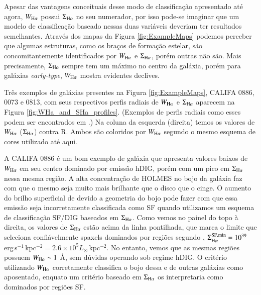 Apesar das vantagens conceituais desse modo de classificação apresentado até agora, $W_{\Ha}$ possui $\Sigma_{\Ha}$ no seu numerador, por isso pode-se imaginar que um modelo de classificação baseado nessas duas variáveis deveriam ter resultados semelhantes. Através dos mapas da Figura \ref{fig:ExampleMaps} podemos perceber que algumas estruturas, como os braços de formação estelar, são concomitantemente identificados por $W_{\Ha}$ e $\Sigma_{\Ha}$, porém outras não são. Mais precisamente, $\Sigma_{\Ha}$ sempre tem um máximo no centro da galáxia, porém para galáxias {\em early-type}, $W_{\Ha}$ mostra evidentes declives.

Três exemplos de galáxias presentes na Figura \ref{fig:ExampleMaps}, CALIFA 0886, 0073 e 0813, com seus respectivos perfis radiais de $W_{\Ha}$ e $\Sigma_{\Ha}$ aparecem na Figura \ref{fig:WHa_and_SHa_profiles}. (Exemplos de perfis radiais como esses podem ser encontrados em \citealt{Papaderos.etal.2013, Belfiore.etal.2016, Belfiore.etal.2017, Gomes.etal.2016b, GonzalezDelgado.etal.2016a}.) Na coluna da esquerda (direita) temos os valores de $W_{\Ha}$ ($\Sigma_{\Ha}$) contra R. Ambos são coloridos por $W_{\Ha}$ segundo o mesmo esquema de cores utilizado até aqui.

A CALIFA 0886 é um bom exemplo de galáxia que apresenta valores baixos de $W_{\Ha}$ em seu centro dominado por emissão hDIG, porém com um pico em $\Sigma_{\Ha}$ nessa mesma região. A alta concentração de HOLMES no bojo da galáxia faz com que o mesmo seja muito mais brilhante que o disco que o cinge. O aumento do brilho superficial de \Ha devido a geometria do bojo pode fazer com que essa emissão seja incorretamente classificada como SF quando utilizamos um esquema de classificação SF/DIG baseados em $\Sigma_{\Ha}$. Como vemos no painel do topo à direita, os valores de $\Sigma_{\Ha}$ estão acima da linha pontilhada, que marca o limite que seleciona confiávelmente spaxels dominados por regiões \hii segundo \citet{Zhang.etal.2017a}, $\Sigma^{\rm SF,min}_{\Ha} = 10^{39}$ erg$\,$s$^{-1}\,$kpc$^{-2} =  2.6 \times 10^{5} L_\odot\,$kpc$^{-2}$. No entanto, vemos que as mesmas regiões possuem $W_{\Ha} \sim 1$ \AA, sem dúvidas operando sob regime hDIG. O critério utilizando $W_{\Ha}$ corretamente classifica o bojo dessa e de outras galáxias como aposentado, enquato um critério baseado em $\Sigma_{\Ha}$ os interpretaria como dominados por regiões SF.

